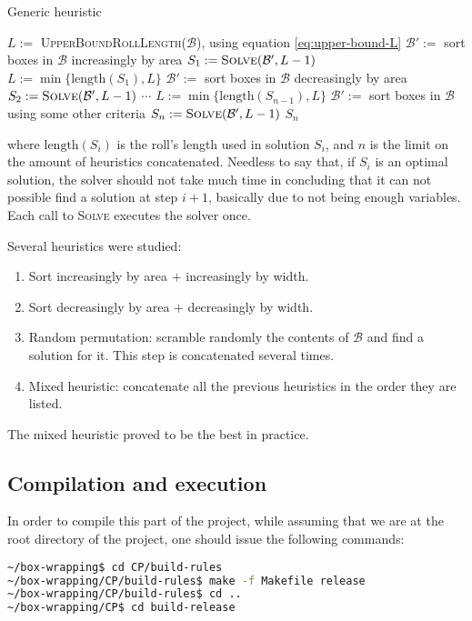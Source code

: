 \begin{algorithm}[H]
	\label{alg:constraint:programming:generic-heuristic}
    \DontPrintSemicolon
    
    \caption{Generic heuristic}
    
	$L := $ \textsc{UpperBoundRollLength}($\mathcal{B}$), using equation \ref{eq:upper-bound-L} \;
	$\mathcal{B}' :=$ sort boxes in $\mathcal{B}$ increasingly by area \;
	$S_1 := \textsc{Solve}(\mathcal{B}', L - 1)$ \;
	\;
	$L := \min\{ \text{length}(S_1), L \}$ \;
	$\mathcal{B}' :=$ sort boxes in $\mathcal{B}$ decreasingly by area \;
	$S_2 := \textsc{Solve}(\mathcal{B}', L - 1)$ \;
	\;
	$\cdots$ \;
	\;
	$L := \min\{ \text{length}(S_{n-1}), L \}$ \;
	$\mathcal{B}' :=$ sort boxes in $\mathcal{B}$ using some other criteria \;
	$S_n := \textsc{Solve}(\mathcal{B}', L - 1)$ \;
	\Return $S_n$
\end{algorithm}

\hfill

where $\text{length}(S_i)$ is the roll's length used in solution $S_i$, and $n$ is
the limit on the amount of heuristics concatenated. Needless to say that, if $S_i$
is an optimal solution, the solver should not take much time in concluding that
it can not possible find a solution at step $i+1$, basically due to not being enough
variables. Each call to \textsc{Solve} executes the solver once.

\hfill

Several heuristics were studied:
\begin{enumerate}
	\item Sort increasingly by area $+$ increasingly by width.
	\item Sort decreasingly by area $+$ decreasingly by width.
	\item Random permutation: scramble randomly the contents of $\mathcal{B}$
	and find a solution for it. This step is concatenated several times.
	\item Mixed heuristic: concatenate all the previous heuristics in the order
	they are listed.
\end{enumerate}

The mixed heuristic proved to be the best in practice.

\subsection{Compilation and execution}
\label{sec:constraint-programming:compilation-execution}

In order to compile this part of the project, while assuming that we are at the
root directory of the project, one should issue the following commands:
\begin{lstlisting}[language=bash]
~/box-wrapping$ cd CP/build-rules
~/box-wrapping/CP/build-rules$ make -f Makefile release
~/box-wrapping/CP/build-rules$ cd ..
~/box-wrapping/CP$ cd build-release
\end{lstlisting}

